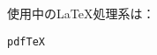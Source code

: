 \documentclass{article}
\begin{document}
使用中のLaTeX処理系は：

\begingroup
\def\engine{}
\ifxetex
  \def\engine{XeTeX}
\else\ifluatex
  \def\engine{LuaTeX}
\else
  \ifdefined\kanjiskip
    \def\engine{(u)pTeX}
  \else
    \def\engine{pdfTeX}
  \fi
\fi\fi
\texttt{\engine}
\endgroup
\end{document}

